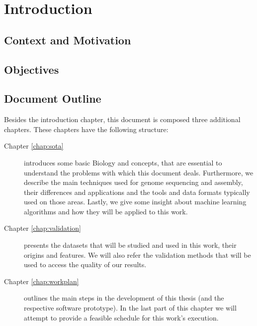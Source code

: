 \chapter{Introduction} \label{chap:intro}

\section*{}

\section{Context and Motivation} \label{sec:context}

\section{Objectives} \label{sec:goals}

\section{Document Outline} \label{sec:outline}

Besides the introduction chapter, this document is composed three additional
chapters. These chapters have the following structure:

\begin{description}

  \item[Chapter \ref{chap:sota}]
  introduces some basic Biology and \rnaseq{} concepts, that are essential to
  understand the problems with which this document deals. Furthermore, we
  describe the main techniques used for genome sequencing and assembly, their
  differences and applications and the tools and data formats typically used on
  those areas. Lastly, we give some insight about machine learning algorithms
  and how they will be applied to this work.

  \item[Chapter \ref{chap:validation}]
  presents the datasets that will be studied and used in this work, their
  origins and features. We will also refer the validation methods that will
  be used to access the quality of our results.

  \item[Chapter \ref{chap:workplan}]
  outlines the main steps in the development of this thesis (and the respective
  software prototype). In the last part of this chapter we will attempt to
  provide a feasible schedule for this work's execution.

\end{description}
